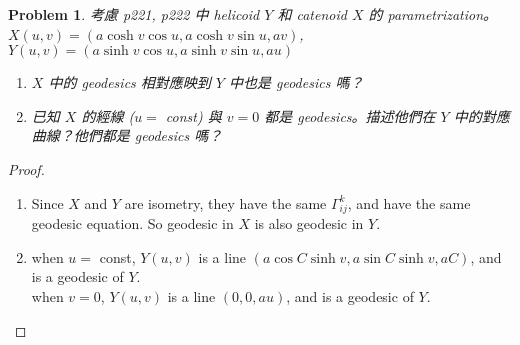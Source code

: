 \documentclass[10pt,a4paper]{article}
\newcounter{theProblemCounter}
\newtheorem{problem}[theProblemCounter]{Problem}
\begin{document}
\setcounter{theProblemCounter}{8}
\begin{problem}
考慮 p221, p222 中 helicoid $Y$ 和 catenoid $X$ 的 parametrization。\\
$X(u,v)=(a\cosh{v}\cos{u},a\cosh{v}\sin{u},av)$, $Y(u,v)=(a\sinh{v}\cos{u},a\sinh{v}\sin{u},au)$
\begin{enumerate}
\item[(a)] $X$ 中的 geodesics 相對應映到 $Y$ 中也是 geodesics 嗎？
\item[(b)] 已知 $X$ 的經線 ($u = $ const) 與 $v=0$ 都是 geodesics。描述他們在 $Y$ 中的對應曲線？他們都是 geodesics 嗎？
\end{enumerate}
\end{problem}
\begin{proof}
\begin{enumerate}
\item[(a)]
Since $X$ and $Y$ are isometry, they have the same $\Gamma^{k}_{ij}$, and have the same geodesic equation. So geodesic in $X$ is also geodesic in $Y$.
\item[(b)]
when $u= $ const, $Y(u,v)$ is a line $(a\cos{C}\sinh{v}, a\sin{C}\sinh{v},aC)$, and is a geodesic of $Y$.\\
when $v=0$, $Y(u,v)$ is a line $(0,0,au)$, and is a geodesic of $Y$.
\end{enumerate}
\end{proof}
\end{document}
